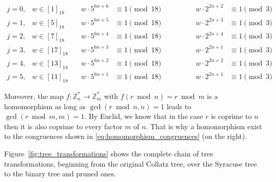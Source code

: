 \begin{equation}
\label{eq:homomorphism_congruences}
\begin{array}{llllll}
	j=0, & w\in [1]_{18} & \hspace{1em} w\cdot5^{6n+6}&\equiv1\pmod{18}&\hspace{4em}w\cdot2^{2n+2} &\equiv1\pmod{3}\\
	j=1, & w\in [5]_{18} & \hspace{1em} w\cdot5^{6n+5}&\equiv1\pmod{18}&\hspace{4em}w\cdot2^{2n+3} &\equiv1\pmod{3}\\
	j=2, & w\in [7]_{18} & \hspace{1em} w\cdot5^{6n+4}&\equiv1\pmod{18}&\hspace{4em}w\cdot2^{2n+4} &\equiv1\pmod{3}\\
	j=3, & w\in [17]_{18} & \hspace{1em} w\cdot5^{6n+3}&\equiv1\pmod{18}&\hspace{4em}w\cdot2^{2n+1} &\equiv1\pmod{3}\\
	j=4, & w\in [13]_{18} & \hspace{1em} w\cdot5^{6n+2}&\equiv1\pmod{18}&\hspace{4em}w\cdot2^{2n+2} &\equiv1\pmod{3}\\
	j=5, & w\in [11]_{18} & \hspace{1em} w\cdot5^{6n+1}&\equiv1\pmod{18}&\hspace{4em}w\cdot2^{2n+1} &\equiv1\pmod{3}
\end{array}
\end{equation}

Moreover, the map $f:\mathbb{Z}^\ast_n\rightarrow \mathbb{Z}^\ast_m$ with $f(r\bmod n)=r\bmod m$ is a homomorphism as long as $\gcd(r\bmod n,n)=1$ leads to $\gcd(r\bmod m,m)=1$. By Euclid, we know that in the case $r$ is coprime to $n$ then it is also coprime to every factor $m$ of $n$. That is why a homomorphism exist to the congruences shown in \ref{eq:homomorphism_congruences} (on the right).

Figure~\ref{fig:tree_transformations} shows the complete chain of tree transformations, beginning from the original Collatz tree, over the Syracuse tree to the binary tree and pruned ones.

